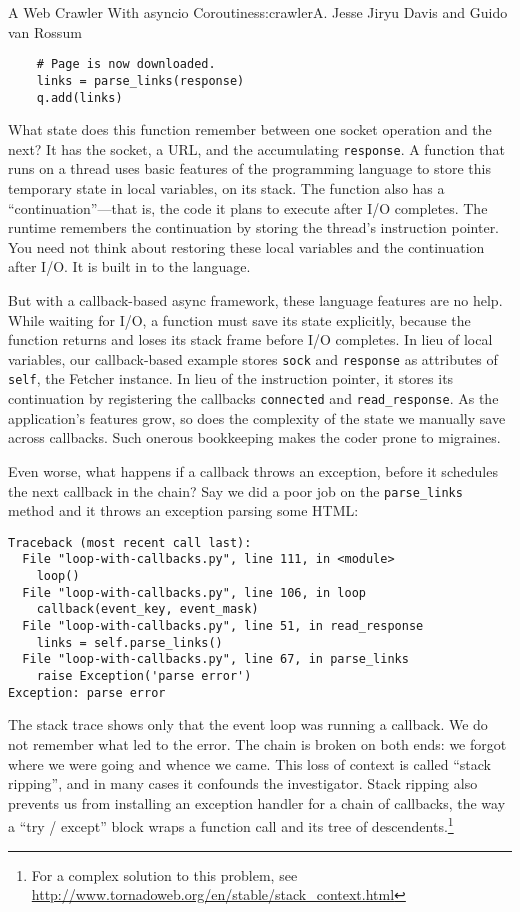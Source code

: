 \begin{aosachapter}{A Web Crawler With asyncio Coroutines}{s:crawler}{A. Jesse Jiryu Davis and Guido van Rossum}
\begin{verbatim}
    # Page is now downloaded.
    links = parse_links(response)
    q.add(links)
\end{verbatim}

What state does this function remember between one socket operation and
the next? It has the socket, a URL, and the accumulating
\texttt{response}. A function that runs on a thread uses basic features
of the programming language to store this temporary state in local
variables, on its stack. The function also has a ``continuation''---that
is, the code it plans to execute after I/O completes. The runtime
remembers the continuation by storing the thread's instruction pointer.
You need not think about restoring these local variables and the
continuation after I/O. It is built in to the language.

But with a callback-based async framework, these language features are
no help. While waiting for I/O, a function must save its state
explicitly, because the function returns and loses its stack frame
before I/O completes. In lieu of local variables, our callback-based
example stores \texttt{sock} and \texttt{response} as attributes of
\texttt{self}, the Fetcher instance. In lieu of the instruction pointer,
it stores its continuation by registering the callbacks
\texttt{connected} and \texttt{read\_response}. As the application's
features grow, so does the complexity of the state we manually save
across callbacks. Such onerous bookkeeping makes the coder prone to
migraines.

Even worse, what happens if a callback throws an exception, before it
schedules the next callback in the chain? Say we did a poor job on the
\texttt{parse\_links} method and it throws an exception parsing some
HTML:

\begin{verbatim}
Traceback (most recent call last):
  File "loop-with-callbacks.py", line 111, in <module>
    loop()
  File "loop-with-callbacks.py", line 106, in loop
    callback(event_key, event_mask)
  File "loop-with-callbacks.py", line 51, in read_response
    links = self.parse_links()
  File "loop-with-callbacks.py", line 67, in parse_links
    raise Exception('parse error')
Exception: parse error
\end{verbatim}

The stack trace shows only that the event loop was running a callback.
We do not remember what led to the error. The chain is broken on both
ends: we forgot where we were going and whence we came. This loss of
context is called ``stack ripping'', and in many cases it confounds the
investigator. Stack ripping also prevents us from installing an
exception handler for a chain of callbacks, the way a ``try / except''
block wraps a function call and its tree of descendents.\footnote{For a
  complex solution to this problem, see
  \url{http://www.tornadoweb.org/en/stable/stack_context.html}}


\end{aosachapter}
